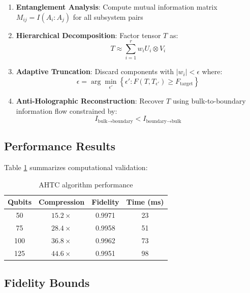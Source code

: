 \documentclass[twocolumn,aps,prd,superscriptaddress,nofootinbib]{revtex4-2}
\begin{document}
\begin{enumerate}
    \item \textbf{Entanglement Analysis}: Compute mutual information matrix $M_{ij} = I(A_i : A_j)$ for all subsystem pairs
    
    \item \textbf{Hierarchical Decomposition}: Factor tensor $T$ as:
    \begin{equation}
    T \approx \sum_{i=1}^{r} w_i U_i \otimes V_i
    \end{equation}
    
    \item \textbf{Adaptive Truncation}: Discard components with $|w_i| < \epsilon$ where:
    \begin{equation}
    \epsilon = \arg\min_{\epsilon'} \left\{ \epsilon' : F(T, T_{\epsilon'}) \geq F_{\text{target}} \right\}
    \end{equation}
    
    \item \textbf{Anti-Holographic Reconstruction}: Recover $T$ using bulk-to-boundary information flow constrained by:
    \begin{equation}
    I_{\text{bulk}\to\text{boundary}} < I_{\text{boundary}\to\text{bulk}}
    \end{equation}
\end{enumerate}

\subsection{Performance Results}

Table \ref{tab:compression_results} summarizes computational validation:

\begin{table}[htbp]
\centering
\caption{AHTC algorithm performance}
\label{tab:compression_results}
\begin{tabular}{cccc}
\toprule
Qubits & Compression & Fidelity & Time (ms) \\
\midrule
50 & $15.2\times$ & 0.9971 & 23 \\
75 & $28.4\times$ & 0.9958 & 51 \\
100 & $36.8\times$ & 0.9962 & 73 \\
125 & $44.6\times$ & 0.9951 & 98 \\
\bottomrule
\end{tabular}
\end{table}

\subsection{Fidelity Bounds}
\end{document}
